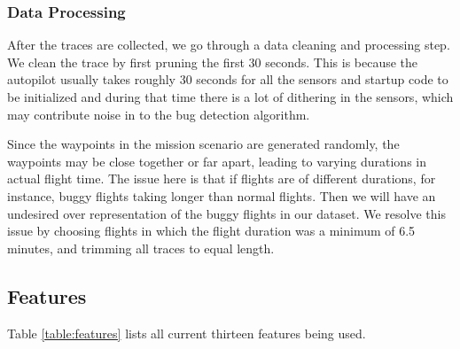 \subsubsection{Data Processing}

After the traces are collected, we go through a data cleaning and
processing step. We clean the trace by first pruning
the first 30 seconds. This is because the autopilot usually takes
roughly 30 seconds for all the sensors and startup code to be
initialized and during that time there is a lot of dithering in the
sensors, which may contribute noise in to the bug detection
algorithm. 

Since the waypoints in the mission scenario are generated
randomly, the waypoints may be close together or far apart, leading to
varying durations in actual flight time. The issue here is that if
flights are of different durations, for instance, buggy flights taking
longer than normal flights. Then we will have an undesired over
representation of the buggy flights in our dataset. We resolve this issue by
choosing flights in which the flight duration was a minimum of 6.5
minutes, and trimming all traces to equal length. 

\subsection{Features}

Table \ref{table:features} lists all current thirteen features being used. 

